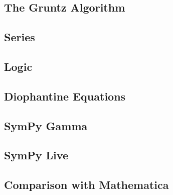 \subsection{The Gruntz Algorithm}



\subsection{Series}



\subsection{Logic}



\subsection{Diophantine Equations}



\subsection{SymPy Gamma}\label{sympy-gamma}



\subsection{SymPy Live}\label{sympy-live}



\subsection{Comparison with Mathematica}


